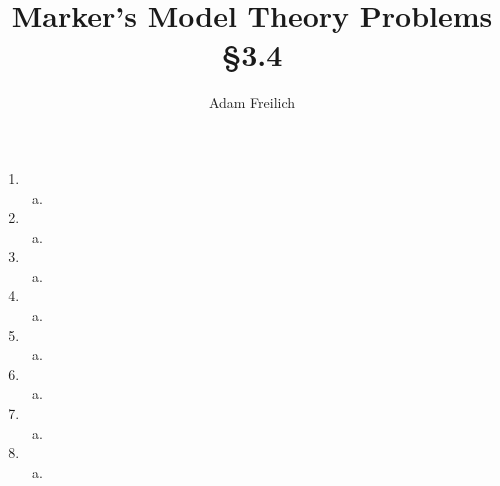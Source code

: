 \documentclass[10pt]{article}
\author{Adam Freilich}
\title{Marker's Model Theory Problems \S 3.4}
\begin{document}
\maketitle

\begin{enumerate}[1.]
\item
 
  \begin{enumerate}[a)] 
  \item 	
  \end{enumerate}

\item
 
  \begin{enumerate}[a)] 
  \item 	
  \end{enumerate}

\item
 
  \begin{enumerate}[a)] 
  \item 	
  \end{enumerate}

\item
 
  \begin{enumerate}[a)] 
  \item 	
  \end{enumerate}

\item
 
  \begin{enumerate}[a)] 
  \item 	
  \end{enumerate}

\item
 
  \begin{enumerate}[a)] 
  \item 	
  \end{enumerate}

\item
 
  \begin{enumerate}[a)] 
  \item 	
  \end{enumerate}

\item
 
  \begin{enumerate}[a)] 
  \item 	
  \end{enumerate}


\end{enumerate}
\end{document}
